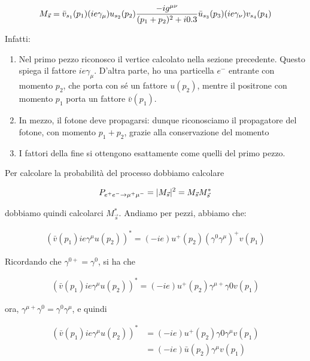 \documentclass[11pt]{report}
\begin{document}
\begin{align}
    M_{\vec{s}} = \bar{v}_{s_1}(p_1)(ie\gamma_\mu)u_{s_2}(p_2)\frac{-ig^{\mu\nu}}{(p_1 + p_2)^2 +i0.3}\bar{u}_{s_3}(p_3)(ie\gamma_\nu)v_{s_4}(p_4)
\end{align}

Infatti: 

\begin{enumerate}
    \item Nel primo pezzo riconosco il vertice calcolato nella sezione precedente. Questo spiega il fattore \(ie\gamma_\mu\). D'altra parte, ho una particella \(e^-\) entrante con momento \(p_2\), che porta con sé un fattore \(u(p_2)\), mentre il positrone con momento \(p_1\) porta un fattore \(\bar{v}(p_1)\). 
    \item In mezzo, il fotone deve propagarsi: dunque riconosciamo il propagatore del fotone, con momento \(p_1+p_2\), grazie alla conservazione del momento 
    \item I fattori della fine si ottengono esattamente come quelli del primo pezzo. 
\end{enumerate}

Per calcolare la probabilità del processo dobbiamo calcolare 

\begin{align}
    P_{e^+e^- \rightarrow \mu^+\mu^-} = \lvert M_{\vec{s}}\rvert^2 = M_{\vec{s}}M^*_{\vec{s}}
\end{align}

dobbiamo quindi calcolarci \(M^*_{\vec{s}}\). Andiamo per pezzi, abbiamo che: 

\begin{align}
    (\bar{v}(p_1)ie\gamma^\mu u(p_2))^* = (-ie)u^+(p_2)(\gamma^0\gamma^\mu)^+v(p_1)
\end{align}

Ricordando che \(\gamma^{0+} = \gamma^0\), si ha che 

\begin{align}
    (\bar{v}(p_1)ie\gamma^\mu u(p_2))^* = (-ie)u^+(p_2)\gamma^{\mu +}\gamma0 v(p_1)
\end{align}

ora, \(\gamma^{\mu +}\gamma^0 = \gamma^0\gamma^{\mu}\), e quindi 

\begin{align}
    (\bar{v}(p_1)ie\gamma^\mu u(p_2))^* &= (-ie)u^+(p_2)\gamma0\gamma^{\mu} v(p_1) \\
    &= (-ie)\bar{u}(p_2)\gamma^{\mu} v(p_1)
\end{align}
\end{document}
